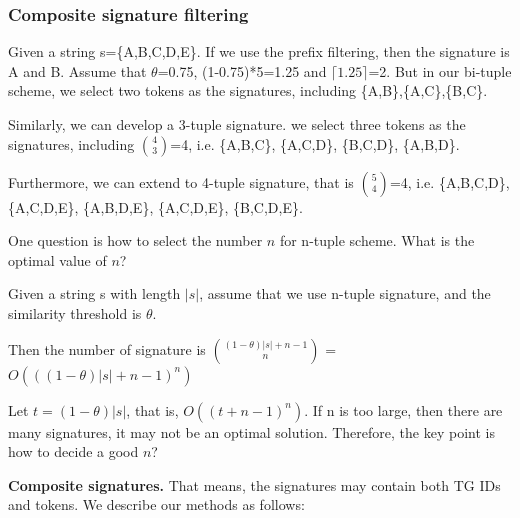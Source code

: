 %
%
%
%
%
%


\subsubsection{Composite signature filtering}


Given a string s=\{A,B,C,D,E\}. If we use the prefix filtering, then the signature is A and B. Assume that $\theta$=0.75, (1-0.75)*5=1.25 and $\lceil 1.25 \rceil$=2. But in our bi-tuple scheme, we select two tokens as the signatures, including \{A,B\},\{A,C\},\{B,C\}.

Similarly, we can develop a 3-tuple signature. we select three tokens as the signatures, including $\binom{4}{3}$=4, i.e. \{A,B,C\}, \{A,C,D\}, \{B,C,D\}, \{A,B,D\}.

Furthermore, we can extend to 4-tuple signature, that is $\binom{5}{4}$=4, i.e. \{A,B,C,D\}, \{A,C,D,E\}, \{A,B,D,E\}, \{A,C,D,E\}, \{B,C,D,E\}.

One question is how to select the number $n$ for n-tuple scheme. What is the optimal value of $n$?

Given a string s with length $|s|$, assume that we use n-tuple signature, and the similarity threshold is $\theta$.

Then the number of signature is  $\binom{(1-\theta)|s|+n-1}{n}$ = $O(((1-\theta)|s|+n-1)^{n})$

Let $t= (1-\theta)|s|$, that is, $O((t+n-1)^{n})$. If n is too large, then there are many signatures, it may not be an optimal solution. Therefore, the key point is how to decide a good $n$?

\smallskip

\noindent \textbf{Composite signatures.} That means, the signatures may contain both TG IDs and tokens. We describe our methods as follows:

